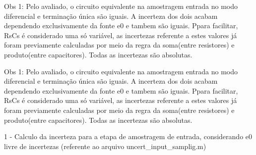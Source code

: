 \documentclass{article}
\begin{document}
\pagestyle{empty}
\begin{Maple Normal}{
\begin{Maple Normal}{
Obs 1: Pelo avaliado, o circuito equivalente na amostragem entrada no modo diferencial e terminação única são iguais. A incerteza dos dois acabam dependendo exclusivamente da fonte e0 e tambem são iguais. Ppara facilitar, RsCs é considerado uma só variável, as incertezas referente a estes valores já foram previamente calculadas por meio da regra da soma(entre resistores) e produto(entre capacitores). Todas as incertezas são absolutas.}\end{Maple Normal}

\begin{Maple Normal}{
Obs 1: Pelo avaliado, o circuito equivalente na amostragem entrada no modo diferencial e terminação única são iguais. A incerteza dos dois acabam dependendo exclusivamente da fonte e0 e tambem são iguais. Ppara facilitar, RsCs é considerado uma só variável, as incertezas referente a estes valores já foram previamente calculadas por meio da regra da soma(entre resistores) e produto(entre capacitores). Todas as incertezas são absolutas.
}\end{Maple Normal}

}\end{Maple Normal}

\begin{Maple Normal}{
\begin{Maple Normal}{
}\end{Maple Normal}
}\end{Maple Normal}
\begin{Maple Normal}{
\begin{Maple Normal}{
1 - Calculo da incerteza para a etapa de amostragem de entrada, considerando e0 livre de incertezas (referente ao arquivo uncert\_input\_samplig.m)}\end{Maple Normal}

}\end{Maple Normal}
\end{document}
